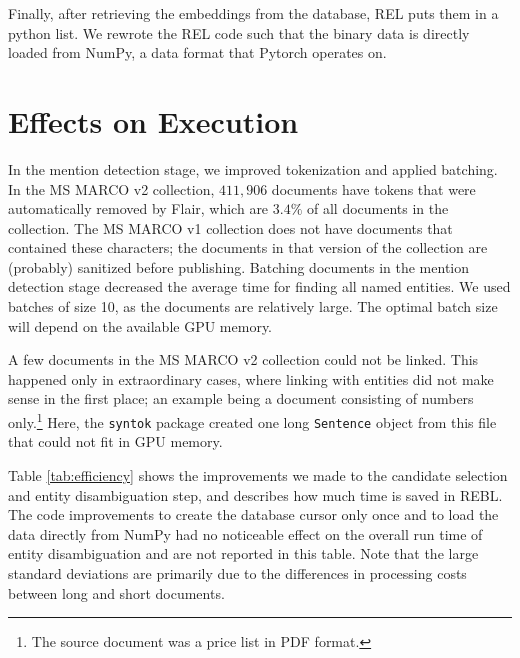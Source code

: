 Finally, after retrieving the embeddings from the database, REL puts them in a python list. We rewrote the REL code such that the binary data is directly loaded from NumPy, a data format that Pytorch operates on. 

\section{Effects on Execution}
In the mention detection stage, we improved tokenization and applied batching. In the MS MARCO v2 collection, $411,906$ documents have tokens that were automatically removed by Flair, which are $3.4\%$ of all documents in the collection. The MS MARCO v1 collection does not have documents that contained these characters; the documents in that version of the collection are (probably) sanitized before publishing.
Batching documents in the mention detection stage decreased the average time for finding all named entities. We used batches of size 10, as the documents are relatively large. The optimal batch size will depend on the available GPU memory.

A few documents in the MS MARCO v2 collection could not be linked. This happened only in extraordinary cases, where linking with entities did not make sense in the first place; an example being a document consisting of numbers only.\footnote{The source document was a price list in PDF format.} Here, the \texttt{syntok} package created one long \texttt{Sentence} object from this file that could not fit in GPU memory.

Table \ref{tab:efficiency} shows the improvements we made to the candidate selection and entity disambiguation step, and describes how much time is saved in REBL. The code improvements to create the database cursor only once and to load the data directly from NumPy had no noticeable effect on the overall run time of entity disambiguation and are not reported in this table. Note that the large standard deviations are primarily due to the differences in processing costs between long and short documents.

